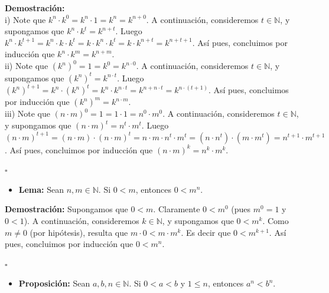 \documentclass[10 pt]{article}
\begin{document}
\Large{\textbf{Demostración:} \\

i) Note que $k^n \cdot k^0=k^n \cdot 1=k^n=k^{n+0}$. A continuación, consideremos $t \in \mathbb N$, y supongamos que $k^n \cdot k^t=k^{n+t}$. Luego $k^n \cdot k^{t+1}=k^n \cdot k \cdot k^t=k \cdot k^n \cdot k^t=k \cdot k^{n+t}=k^{n+t+1}$. Así pues, concluimos por inducción que $k^n \cdot k^m=k^{n+m}$. \\

ii) Note que $(k^n)^0=1=k^0=k^{n \cdot 0}$. A continuación, consideremos $t \in \mathbb N$, y supongamos que $(k^n)^t=k^{n \cdot t}$. Luego $(k^n)^{t+1}=k^n \cdot (k^n)^t=k^n \cdot k^{n \cdot t}=k^{n+n \cdot t}=k^{n \cdot (t+1)}$. Así pues, concluimos por inducción que $(k^n)^m=k^{n \cdot m}$. \\

iii) Note que $(n \cdot m)^0=1=1 \cdot 1=n^0 \cdot m^0$. A continuación, consideremos $t \in \mathbb N$, y supongamos que $(n \cdot m)^t=n^t \cdot m^t$. Luego $(n \cdot m)^{t+1}=(n \cdot m) \cdot (n \cdot m)^{t}=n \cdot m \cdot n^t \cdot m^t=(n \cdot n^t) \cdot (m \cdot m^t)=n^{t+1} \cdot m^{t+1}$. Así pues, concluimos por inducción que $(n \cdot m)^k=n^k \cdot m^k$.} \\

\begin{flushright}
    $\square$
\end{flushright}

\begin{itemize}
    \item \Large{\textbf{Lema:} Sean $n,m \in \mathbb N$. Si $0<m$, entonces $0<m^n$.} \\
\end{itemize}

\Large{\textbf{Demostración:} Supongamos que $0<m$. Claramente $0<m^0$ (pues $m^0=1$ y $0<1$). A continuación, consideremos $k \in \mathbb N$, y supongamos que $0<m^k$. Como $m \neq 0$ (por hipótesis), resulta que $m \cdot 0<m \cdot m^k$. Es decir que $0<m^{k+1}$. Así pues, concluimos por inducción que $0<m^n$.} \\

\begin{flushright}
    $\square$
\end{flushright}

\begin{itemize}
    \item \Large{\textbf{Proposición:} Sean $a,b,n \in \mathbb N$. Si $0<a<b$ y $1 \leq n$, entonces $a^n<b^n$.} \\
\end{itemize}
\end{document}
